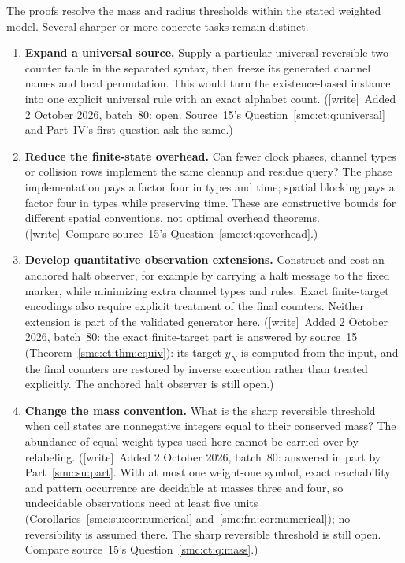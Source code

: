 \documentclass[11pt,letterpaper]{article}
\numberwithin{equation}{section}
\theoremstyle{definition}
\theoremstyle{remark}
\newcommand{\wtag}{\textup{[write]}}
\begin{document}
The proofs resolve the mass and radius thresholds within the stated weighted model. Several sharper or more concrete tasks remain distinct.
\begin{enumerate}
\item\label{smc:tm:q:source} \textbf{Expand a universal source.} Supply a particular universal reversible two-counter table in the separated syntax, then freeze its generated channel names and local permutation. This would turn the existence-based instance into one explicit universal rule with an exact alphabet count. (\wtag\ Added 2 October 2026, batch~80: open. Source~15's Question~\ref{smc:ct:q:universal} and Part~IV's first question ask the same.)
\item\label{smc:tm:q:overhead} \textbf{Reduce the finite-state overhead.} Can fewer clock phases, channel types or collision rows implement the same cleanup and residue query? The phase implementation pays a factor four in types and time; spatial blocking pays a factor four in types while preserving time. These are constructive bounds for different spatial conventions, not optimal overhead theorems. (\wtag\ Compare source~15's Question~\ref{smc:ct:q:overhead}.)
\item\label{smc:tm:q:observe} \textbf{Develop quantitative observation extensions.} Construct and cost an anchored halt observer, for example by carrying a halt message to the fixed marker, while minimizing extra channel types and rules. Exact finite-target encodings also require explicit treatment of the final counters. Neither extension is part of the validated generator here. (\wtag\ Added 2 October 2026, batch~80: the exact finite-target part is answered by source~15 (Theorem~\ref{smc:ct:thm:equiv}): its target $y_N$ is computed from the input, and the final counters are restored by inverse execution rather than treated explicitly. The anchored halt observer is still open.)
\item\label{smc:tm:q:mass} \textbf{Change the mass convention.} What is the sharp reversible threshold when cell states are nonnegative integers equal to their conserved mass? The abundance of equal-weight types used here cannot be carried over by relabeling. (\wtag\ Added 2 October 2026, batch~80: answered in part by Part~\ref{smc:su:part}. With at most one weight-one symbol, exact reachability and pattern occurrence are decidable at masses three and four, so undecidable observations need at least five units (Corollaries~\ref{smc:su:cor:numerical} and~\ref{smc:fm:cor:numerical}); no reversibility is assumed there. The sharp reversible threshold is still open. Compare source~15's Question~\ref{smc:ct:q:mass}.)

\end{enumerate}
\end{document}
